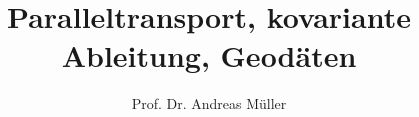 %
%
%


\beamertemplatenavigationsymbolsempty
\title[Zusammenhang]{Paralleltransport, kovariante Ableitung, Geodäten}
\author[A.~Müller]{Prof. Dr. Andreas Müller}
\date[]{}

